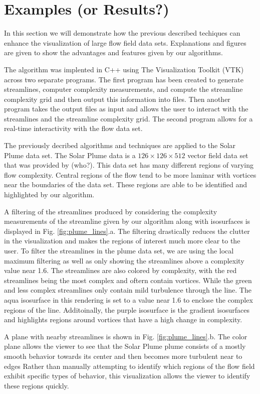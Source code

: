 \documentclass{egpubl}
\begin{document}
\section{Examples (or Results?)} \label{sec:examples}

In this section we will demonstrate how the previous described techiques can enhance the visualization of large flow field data sets.
Explanations and figures are given to show the advantages and features given by our algorithms.

The algorithm was implented in C++ using The Visualization Toolkit (VTK) across two separate programs.
The first program has been created to generate streamlines, computer complexity measurements, and compute the streamline complexity grid and then output this information into files.
Then another program takes the output files as input and allows the user to interact with the streamlines and the streamline complexity grid.
The second program allows for a real-time interactivity with the flow data set.

The previously decribed algorithms and techniques are applied to the Solar Plume data set.
The Solar Plume data is a $126 \times 126 \times 512$ vector field data set that was provided by (who?).
This data set has many different regions of varying flow complexity.
Central regions of the flow tend to be more laminar with vortices near the boundaries of the data set.
These regions are able to be identified and highlighted by our algorithm.

A filtering of the streamlines produced by considering the complexity measurements of the streamline given by our algorithm along with isosurfaces is displayed in Fig. \ref{fig:plume_lines}.a.
The filtering drastically reduces the clutter in the visualization and makes the regions of interest much more clear to the user.
To filter the streamlines in the plume data set, we are using the local maximum filtering as well as only showing the streamlines above a complexity value near 1.6.
The streamlines are also colored by complexity, with the red streamlines being the most complex and oftern contain vortices.
While the green and less complex streamlines only contain mild turbulence through the line.
The aqua isosurface in this rendering is set to a value near 1.6 to enclose the complex regions of the line.
Additoinally, the purple isosurface is the gradient isosurfaces and highlights regions around vortices that have a high change in complexity.

A plane with nearby streamlines is shown in Fig. \ref{fig:plume_lines}.b.
The color plane allows the viewer to see that the Solar Plume plume consists of a mostly smooth behavior towards its center and then becomes more turbulent near to edges
Rather than manually attempting to identify which regions of the flow field exhibit specific types of behavior, this visualization allows the viewer to identify these regions quickly.
\end{document}
